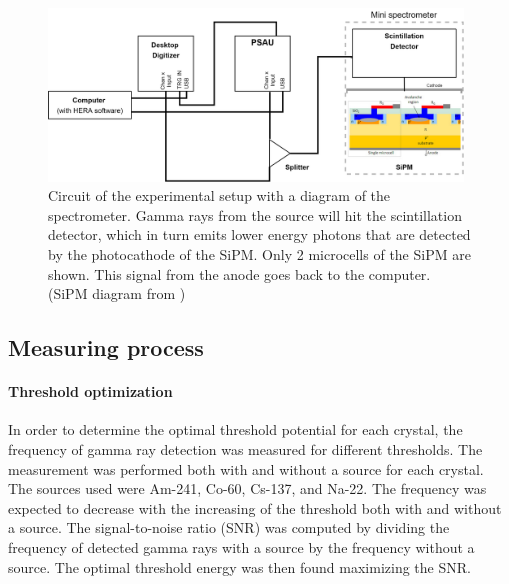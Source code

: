 \documentclass[a4paper, 11pt, table]{article}
\begin{document}
\begin{figure} [h!]
    \centering
    \includegraphics[width=0.98\textwidth]{figures/exp_setup_GMA.png}
    \caption{Circuit of the experimental setup with a diagram of the spectrometer. Gamma rays from the source will hit the scintillation detector, which in turn emits lower energy photons that are detected by the photocathode of the SiPM. Only 2 microcells of the SiPM are shown. This signal from the anode goes back to the computer. (SiPM diagram from \cite{kk_2016_what})}%
    \label{fig:setup}
\end{figure}


\subsection{Measuring process}
\paragraph{Threshold optimization}
In order to determine the optimal threshold potential for each crystal, the frequency of gamma ray detection was measured for different thresholds. The measurement was performed both with and without a source for each crystal. The sources used were Am-241, Co-60, Cs-137, and Na-22. The frequency was expected to decrease with the increasing of the threshold both with and without a source. The signal-to-noise ratio (SNR) was computed by dividing the frequency of detected gamma rays with a source by the frequency without a source. The optimal threshold energy was then found maximizing the SNR.
\end{document}
